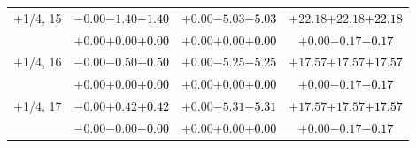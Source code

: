 \documentclass[compress]{beamer}
\begin{document}
\begin{frame}
\begin{tabular}{r | c | c | c}
$+$1/4, 15 & $-0.00$\hspace{0.1 cm}$-1.40$\hspace{0.1 cm}\textcolor{black}{$-1.40$} & $+0.00$\hspace{0.1 cm}$-5.03$\hspace{0.1 cm}\textcolor{black}{$-5.03$} & $+22.18$\hspace{0.1 cm}$+22.18$\hspace{0.1 cm}\textcolor{black}{$+22.18$} \\
           & $+0.00$\hspace{0.1 cm}$+0.00$\hspace{0.1 cm}\textcolor{black}{$+0.00$} & $+0.00$\hspace{0.1 cm}$+0.00$\hspace{0.1 cm}\textcolor{black}{$+0.00$} & $+0.00$\hspace{0.1 cm}$-0.17$\hspace{0.1 cm}\textcolor{black}{$-0.17$} \\
$+$1/4, 16 & $-0.00$\hspace{0.1 cm}$-0.50$\hspace{0.1 cm}\textcolor{black}{$-0.50$} & $+0.00$\hspace{0.1 cm}$-5.25$\hspace{0.1 cm}\textcolor{black}{$-5.25$} & $+17.57$\hspace{0.1 cm}$+17.57$\hspace{0.1 cm}\textcolor{black}{$+17.57$} \\
           & $+0.00$\hspace{0.1 cm}$+0.00$\hspace{0.1 cm}\textcolor{black}{$+0.00$} & $+0.00$\hspace{0.1 cm}$+0.00$\hspace{0.1 cm}\textcolor{black}{$+0.00$} & $+0.00$\hspace{0.1 cm}$-0.17$\hspace{0.1 cm}\textcolor{black}{$-0.17$} \\
$+$1/4, 17 & $-0.00$\hspace{0.1 cm}$+0.42$\hspace{0.1 cm}\textcolor{black}{$+0.42$} & $+0.00$\hspace{0.1 cm}$-5.31$\hspace{0.1 cm}\textcolor{black}{$-5.31$} & $+17.57$\hspace{0.1 cm}$+17.57$\hspace{0.1 cm}\textcolor{black}{$+17.57$} \\
           & $-0.00$\hspace{0.1 cm}$-0.00$\hspace{0.1 cm}\textcolor{black}{$-0.00$} & $+0.00$\hspace{0.1 cm}$+0.00$\hspace{0.1 cm}\textcolor{black}{$+0.00$} & $+0.00$\hspace{0.1 cm}$-0.17$\hspace{0.1 cm}\textcolor{black}{$-0.17$} \\

\end{tabular}
\end{frame}
\end{document}
